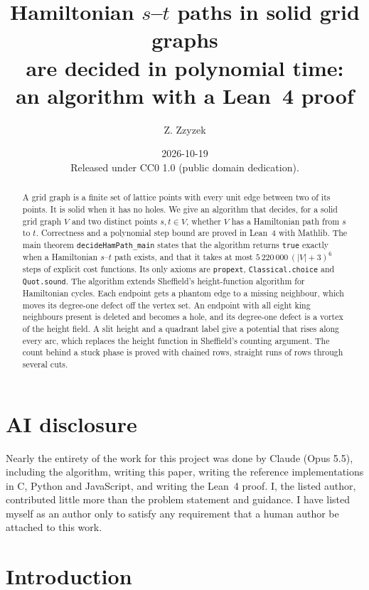 \documentclass[11pt]{article}
\title{Hamiltonian $s$--$t$ paths in solid grid graphs\\are decided in polynomial time:\\an algorithm with a Lean~4 proof}
\author{Z. Zzyzek}
\date{2026-10-19 \\[2pt] \small Released under CC0 1.0 (public domain dedication).}
\theoremstyle{plain}
\theoremstyle{definition}
\theoremstyle{remark}
\newcommand{\lean}[1]{\texttt{#1}}
\begin{document}
\maketitle

\begin{abstract}
A grid graph is a finite set of lattice points with every unit edge between two of its points.
It is solid when it has no holes.
We give an algorithm that decides, for a solid grid graph $V$ and two distinct points $s,t\in V$,
whether $V$ has a Hamiltonian path from $s$ to $t$.
Correctness and a polynomial step bound are proved in Lean~4 with Mathlib.
The main theorem \lean{decideHamPath\_main} states that the algorithm returns \lean{true} exactly when a
Hamiltonian $s$--$t$ path exists, and that it takes at most $5\,220\,000\,(|V|+3)^6$ steps
of explicit cost functions.
Its only axioms are \lean{propext}, \lean{Classical.choice} and \lean{Quot.sound}.
The algorithm extends Sheffield's height-function algorithm for Hamiltonian cycles.
Each endpoint gets a phantom edge to a missing neighbour, which moves its degree-one defect off the
vertex set.
An endpoint with all eight king neighbours present is deleted and becomes a hole, and its
degree-one defect is a vortex of the height field.
A slit height and a quadrant label give a potential that rises along every arc, which replaces the
height function in Sheffield's counting argument.
The count behind a stuck phase is proved with chained rows, straight runs of rows through several cuts.
\end{abstract}

\section*{AI disclosure}
Nearly the entirety of the work for this project was done by Claude (Opus 5.5), including the
algorithm, writing this paper, writing the reference implementations in C, Python and JavaScript,
and writing the Lean~4 proof.
I, the listed author, contributed little more than the problem statement and guidance.
I have listed myself as an author only to satisfy any requirement that a human author be attached
to this work.

\tableofcontents

\section{Introduction}
\label{sec:intro}
\end{document}
